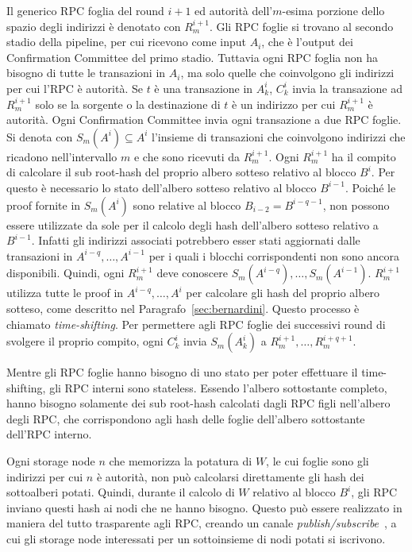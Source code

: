 Il generico RPC foglia del round $i+1$ ed autorità dell'$m$-esima porzione dello spazio degli indirizzi è denotato con $R_m^{i+1}$. Gli RPC foglie si trovano al secondo stadio della pipeline, per cui ricevono come input $A_i$, che è l'output dei Confirmation Committee del primo stadio. Tuttavia ogni RPC foglia non ha bisogno di tutte le transazioni in $A_i$, ma solo quelle che coinvolgono gli indirizzi per cui l'RPC è autorità. Se $t$ è una transazione in $A_k^i$, $C_k^i$ invia la transazione ad $R_m^{i+1}$ solo se la sorgente o la destinazione di $t$ è un indirizzo per cui $R_m^{i+1}$ è autorità. Ogni Confirmation Committee invia ogni transazione a due RPC foglie. Si denota con $S_m(A^i) \subseteq A^i$ l'insieme di transazioni che coinvolgono indirizzi che ricadono nell'intervallo $m$ e che sono ricevuti da $R_m^{i+1}$. Ogni $R_m^{i+1}$ ha il compito di calcolare il sub root-hash del proprio albero sotteso relativo al blocco $B^i$. Per questo è necessario lo stato dell'albero sotteso relativo al blocco $B^{i-1}$. Poiché le proof fornite in $S_m(A^i)$ sono relative al blocco $B_{i-2} = B^{i-q-1}$, non possono essere utilizzate da sole per il calcolo degli hash dell'albero sotteso relativo a $B^{i-1}$. Infatti gli indirizzi associati potrebbero esser stati aggiornati dalle transazioni in $A^{i-q}, \dots, A^{i-1}$ per i quali i blocchi corrispondenti non sono ancora disponibili. Quindi, ogni $R_m^{i+1}$ deve conoscere $S_m(A^{i-q}), \dots, S_m(A^{i-1})$. $R_m^{i+1}$ utilizza tutte le proof in $A^{i-q}, \dots, A^{i}$ per calcolare gli hash del proprio albero sotteso, come descritto nel Paragrafo~\ref{sec:bernardini}. Questo processo è chiamato \emph{time-shifting}. Per permettere agli RPC foglie dei successivi round di svolgere il proprio compito, ogni $C_k^i$ invia $S_m(A_k^i)$ a $R_m^{i+1}, \dots, R_m^{i+q+1}$.

Mentre gli RPC foglie hanno bisogno di uno stato per poter effettuare il time-shifting, gli RPC interni sono stateless. Essendo l'albero sottostante completo, hanno bisogno solamente dei sub root-hash calcolati dagli RPC figli nell'albero degli RPC, che corrispondono agli hash delle foglie dell'albero sottostante dell'RPC interno.

Ogni storage node $n$ che memorizza la potatura di $W$, le cui foglie sono gli indirizzi per cui $n$ è autorità, non può calcolarsi direttamente gli hash dei sottoalberi potati. Quindi, durante il calcolo di $W$ relativo al blocco $B^i$, gli RPC inviano questi hash ai nodi che ne hanno bisogno. Questo può essere realizzato in maniera del tutto trasparente agli RPC, creando un canale \textit{publish/subscribe}~\cite{eugster2003many}, a cui gli storage node interessati per un sottoinsieme di nodi potati si iscrivono.

